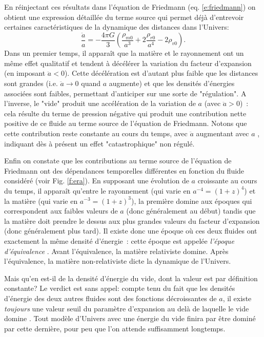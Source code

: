 En réinjectant ces résultats dans l'équation de Friedmann (eq. \ref{e:friedmann})  on obtient une expression détaillée du terme source qui permet déjà d'entrevoir certaines caractéristiques de la dynamique des distances dans l'Univers:
\begin{equation}
\frac{\ddot a}{a}=-\frac{4\pi G}{3}(\frac{\rho_{m0}}{a^3}+2\frac{\rho_{r0}}{a^4}-2\rho_{v0}).
\label{e:esource}
\end{equation}
Dans un premier temps, il apparaît que la matière et le rayonnement ont un même effet qualitatif et tendent à décélérer la variation du facteur d'expansion (en imposant $\ddot a<0$). Cette décélération est d'autant plus faible que les distances  sont grandes (i.e. $\ddot a \rightarrow 0$ quand $a$ augmente) et que les densités d'énergies associées sont faibles, permettant d'anticiper sur une sorte de "régulation". A l'inverse, le "vide" produit une accélération de la variation de $a$ (avec $\ddot a>0$)~: cela résulte du terme de pression négative qui produit une contribution nette positive de ce fluide au terme source de l'équation de Friedmann. Notons que cette contribution reste constante au cours du temps, avec $\ddot a$ augmentant avec $a$ , indiquant dès à présent un effet "catastrophique" non régulé. 

Enfin on constate que les contributions au terme source de l'équation de Friedmann ont des dépendances temporelles différentes en fonction du fluide considéré (voir Fig. \ref{f:era}). En supposant une évolution de $a$ croissante au cours du temps, il apparaît qu'entre le rayonnement (qui varie en $a^{-4}=(1+z)^4$) et la matière (qui varie en $a^{-3}=(1+z)^3$), la première domine aux époques qui correspondent aux faibles valeurs de $a$ (donc généralement au début) tandis que la matière doit prendre le dessus aux plus grandes valeurs du facteur d'expansion (donc généralement plus tard). Il existe donc une époque où ces deux fluides ont exactement la même densité d'énergie~: cette époque est appelée \textit{l'époque d'équivalence} . Avant l'équivalence, la matière relativiste domine. Après l'équivalence, la matière non-relativiste dicte la dynamique de l'Univers.

Mais qu'en est-il de la densité d'énergie du vide, dont la valeur est par définition constante? Le verdict est sans appel: compte tenu du fait que les densités d'énergie des deux autres fluides sont des fonctions décroissantes de $a$, il existe \textit{toujours} une valeur seuil du paramètre d'expansion au delà de laquelle le vide domine . Tout modèle d'Univers avec une énergie du vide finira par être dominé par cette dernière, pour peu que l'on attende suffisamment longtemps.

